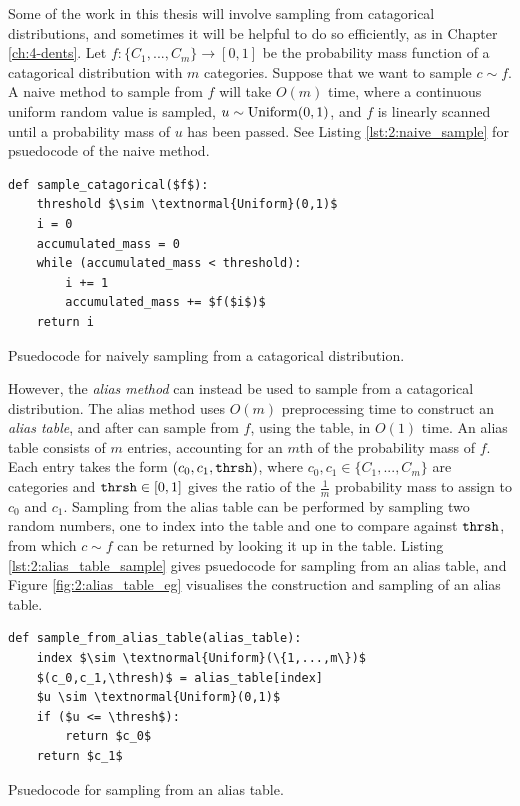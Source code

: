     Some of the work in this thesis will involve sampling from catagorical distributions, and sometimes it will be helpful to do so efficiently, as in Chapter \ref{ch:4-dents}. Let $f:\{C_1,...,C_m\}\rightarrow[0,1]$ be the probability mass function of a catagorical distribution with $m$ categories. Suppose that we want to sample $c\sim f$. A naive method to sample from $f$ will take $O(m)$ time, where a continuous uniform random value is sampled, $u\sim\textnormal{Uniform}(0,1)$, and $f$ is linearly scanned until a probability mass of $u$ has been passed. See Listing \ref{lst:2:naive_sample} for psuedocode of the naive method.

    \begin{Listing}
        \begin{lstlisting}
def sample_catagorical($f$):
    threshold $\sim \textnormal{Uniform}(0,1)$
    i = 0
    accumulated_mass = 0
    while (accumulated_mass < threshold):
        i += 1
        accumulated_mass += $f($i$)$
    return i
        \end{lstlisting}
        \caption{Psuedocode for naively sampling from a catagorical distribution.}
        \label{lst:2:naive_sample}
    \end{Listing}

    However, the \textit{alias method} \cite{alias_method_one,alias_method_two} can instead be used to sample from a catagorical distribution. The alias method uses $O(m)$ preprocessing time to construct an \textit{alias table}, and after can sample from $f$, using the table, in $O(1)$ time. An alias table consists of $m$ entries, accounting for an $m$th of the probability mass of $f$. Each entry takes the form $(c_0,c_1,{\texttt{thrsh}})$, where $c_0,c_1\in\{C_1,...,C_m\}$ are categories and ${\texttt{thrsh}}\in[0,1]$ gives the ratio of the $\frac{1}{m}$ probability mass to assign to $c_0$ and $c_1$. Sampling from the alias table can be performed by sampling two random numbers, one to index into the table and one to compare against ${\texttt{thrsh}}$, from which $c\sim f$ can be returned by looking it up in the table. Listing \ref{lst:2:alias_table_sample} gives psuedocode for sampling from an alias table, and Figure \ref{fig:2:alias_table_eg} visualises the construction and sampling of an alias table.

    \begin{Listing}
        \begin{lstlisting}
def sample_from_alias_table(alias_table):
    index $\sim \textnormal{Uniform}(\{1,...,m\})$
    $(c_0,c_1,\thresh)$ = alias_table[index]
    $u \sim \textnormal{Uniform}(0,1)$
    if ($u <= \thresh$):
        return $c_0$ 
    return $c_1$
        \end{lstlisting}
        \caption{Psuedocode for sampling from an alias table.}
        \label{lst:2:alias_table_sample}
    \end{Listing}

